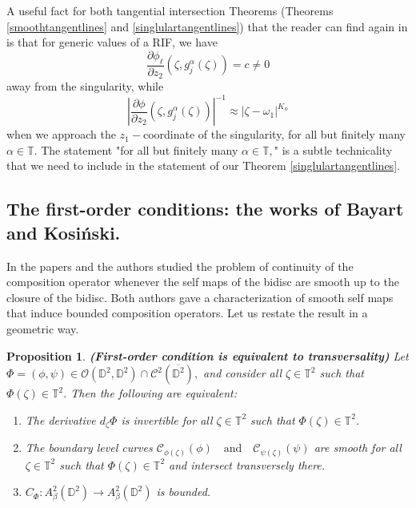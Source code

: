 \documentclass[12pt]{amsart}
\newtheorem{proposition}[theorem]{Proposition}
\numberwithin{equation}{section}
\begin{document}
A useful fact for both tangential intersection Theorems (Theorems \ref{smoothtangentlines} and \ref{singlulartangentlines}) that the reader can find again in \cite{Clark} is that for generic values of a RIF, we have $$\frac{\partial{\phi_{\ell}}}{\partial z_2}(\zeta,g_j^{\alpha}(\zeta))=c\neq 0$$ away from the singularity, while $$\left|\frac{\partial\phi}{\partial z_2}(\zeta,g_j^{\alpha}(\zeta))\right|^{-1}\approx |\zeta-\omega_1|^{K_\phi}$$ when we approach the $z_1-$coordinate of the singularity, for all but finitely many $\alpha\in\mathbb{T}.$ The statement "for all but finitely many $\alpha\in\mathbb{T},$" is a subtle technicality that we need to include in the statement of our Theorem \ref{singlulartangentlines}.

\subsection{The first-order conditions: the works of Bayart and Kosi\'nski.}\label{smooth}
In the papers \cite{Bayart1} and \cite{CompositionsKosinski} the authors studied the problem of continuity of the composition operator whenever the self maps of the bidisc are smooth up to the closure of the bidisc. Both authors gave a characterization of smooth self maps that induce bounded composition operators. Let us restate the result in a geometric way.
\begin{proposition}\label{transverse}\textbf{(First-order condition is equivalent to transversality)}
Let $\Phi=(\phi,\psi)\in \mathcal O(\mathbb D^2,\mathbb D^2)\cap \mathcal{C}^2(\overline{\mathbb D^2}),$
and consider all $\zeta\in \mathbb T^2$ such that
$\Phi(\zeta)\in \mathbb T^2.$
Then the following are equivalent:
\begin{enumerate}
    \item The derivative $d_{\zeta}\Phi$ is invertible for all $\zeta\in\mathbb{T}^2$ such that $\Phi(\zeta)\in\mathbb{T}^2$.
    \item The boundary level curves
    $\mathcal{C}_{\phi(\zeta)}(\phi)\quad \mathrm{and}\quad
    \mathcal{C}_{\psi(\zeta)}(\psi)$
    are smooth for all $\zeta\in\mathbb{T}^2$ such that $\Phi(\zeta)\in\mathbb{T}^2$ and intersect transversely there.
    \item $C_{\Phi}:A^2_{\beta}(\mathbb{D}^2)\to A^2_{\beta}(\mathbb{D}^2)$ is bounded.
\end{enumerate}
\end{proposition}
\end{document}
